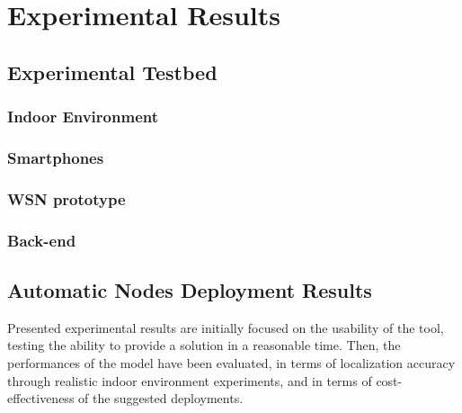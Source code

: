 %
%
\chapter{Experimental Results}
%
\label{cap:results}
%
\section{Experimental Testbed}
\subsection{Indoor Environment}
\subsection{Smartphones}
\subsection{WSN prototype}
\subsection{Back-end}
\section{Automatic Nodes Deployment Results}
Presented experimental results are initially focused on the usability of the tool, testing the ability to provide a solution in a reasonable time. Then, the performances of the model have been evaluated, in terms of localization accuracy through realistic indoor environment experiments, and in terms of cost-effectiveness of the suggested deployments.

